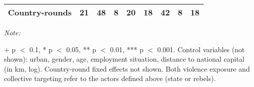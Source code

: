 \begin{table}[!h]
{\begin{threeparttable}
\begin{tabular}[t]{lcccccccc}
Country-rounds & 21 & 48 & 8 & 20 & 18 & 42 & 8 & 18\\
\bottomrule
\end{tabular}
\begin{tablenotes}[para]
\item \textit{Note: } 
\item + p $<$ 0.1, * p $<$ 0.05, ** p $<$ 0.01, *** p $<$ 0.001. Control variables (not shown): urban, gender, age, employment situation, distance to national capital (in km, log). Country-round fixed effects not shown. Both violence exposure and collective targeting refer to the actors defined above (state or rebels).
\end{tablenotes}
\end{threeparttable}}
\end{table}

